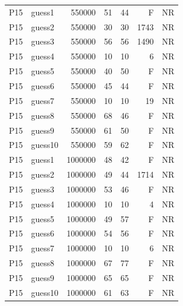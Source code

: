 {\begin{longtable}{llrrrrr}
P15 & guess1 & 550000 & 51 & 44 & F & NR \\
P15 & guess2 & 550000 & 30 & 30 & 1743 & NR \\
P15 & guess3 & 550000 & 56 & 56 & 1490 & NR \\
P15 & guess4 & 550000 & 10 & 10 & 6 & NR \\
P15 & guess5 & 550000 & 40 & 50 & F & NR \\
P15 & guess6 & 550000 & 45 & 44 & F & NR \\
P15 & guess7 & 550000 & 10 & 10 & 19 & NR \\
P15 & guess8 & 550000 & 68 & 46 & F & NR \\
P15 & guess9 & 550000 & 61 & 50 & F & NR \\
P15 & guess10 & 550000 & 59 & 62 & F & NR \\
P15 & guess1 & 1000000 & 48 & 42 & F & NR \\
P15 & guess2 & 1000000 & 49 & 44 & 1714 & NR \\
P15 & guess3 & 1000000 & 53 & 46 & F & NR \\
P15 & guess4 & 1000000 & 10 & 10 & 4 & NR \\
P15 & guess5 & 1000000 & 49 & 57 & F & NR \\
P15 & guess6 & 1000000 & 54 & 56 & F & NR \\
P15 & guess7 & 1000000 & 10 & 10 & 6 & NR \\
P15 & guess8 & 1000000 & 67 & 77 & F & NR \\
P15 & guess9 & 1000000 & 65 & 65 & F & NR \\
P15 & guess10 & 1000000 & 61 & 63 & F & NR \\
\end{longtable}}

